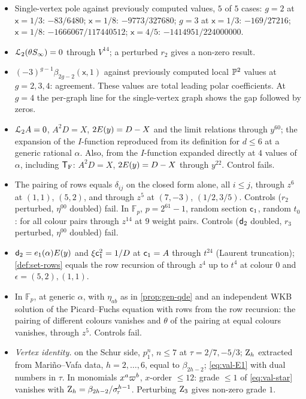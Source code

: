 \begin{itemize}
\item Single-vertex pole against previously computed values, $5$ of $5$ cases: $g=2$ at $\mathsf{x}=1/3$: $-83/6480$; $\mathsf{x}=1/8$: $-9773/327680$; $g=3$ at $\mathsf{x}=1/3$: $-169/27216$; $\mathsf{x}=1/8$: $-1666067/117440512$; $\mathsf{x}=4/5$: $-1414951/224000000$.
\item $\mathcal{L}_{2}(\theta S_{\infty})=0$ through $V^{14}$; a perturbed $r_2$ gives a non-zero result.
\item $(-3)^{g-1}\beta_{2g-2}(\mathsf{x},1)$ against previously computed local $\mathbb{P}^2$ values at $g=2,3,4$: agreement. These values are total leading polar coefficients. At $g=4$ the per-graph line for the single-vertex graph shows the gap followed by zeros.
\item $\mathcal{L}_{2} A=0$, $A^2D=X$, $2E(y)=D-X$ and the limit relations through $y^{60}$; the expansion of the $I$-function reproduced from its definition for $d\leq 6$ at a generic rational $\alpha$. Also, from the $I$-function expanded directly at $4$ values of $\alpha$, including $\mathsf{T}_{\mathrm{F}}$: $A^2D=X$, $2E(y)=D-X$ through $y^{22}$. Control fails.
\item The pairing of rows equals $\delta_{ij}$ on the closed form alone, all $i\leq j$, through $z^6$ at $(1,1)$, $(5,2)$, and through $z^5$ at $(7,-3)$, $(1/2,3/5)$. Controls ($r_2$ perturbed, $\eta^{00}$ doubled) fail. In $\mathbb{F}_p$, $p=2^{61}-1$, random section $\mathsf{c}_{1}$, random $t_0$: for all colour pairs through $z^{14}$ at $9$ weight pairs. Controls ($\mathsf{d}_{2}$ doubled, $r_3$ perturbed, $\eta^{00}$ doubled) fail.
\item $\mathsf{d}_{2}=e_1(\alpha)E(y)$ and $\xi\mathsf{c}_{1}^2=1/D$ at $\mathsf{c}_{1}=A$ through $t^{24}$ (Laurent truncation); \cref{def:set-rows} equals the row recursion of \cite{BS} through $z^4$ up to $t^4$ at colour $0$ and $\epsilon=(5,2),(1,1)$.
\item In $\mathbb{F}_p$, at generic $\alpha$, with $\eta_{ab}$ as in \cref{prop:gen-qde} and an independent WKB solution of the Picard--Fuchs equation with rows from the row recursion: the pairing of different colours vanishes and $\theta$ of the pairing at equal colours vanishes, through $z^5$. Controls fail.
\item \emph{Vertex identity.}  on the Schur side, $p_1^n$, $n\leq 7$ at $\tau=2/7,-5/3$; $\mathrm{Z}_h$ extracted from Mari\~no--Vafa data, $h=2,\dots,6$, equal to $\beta_{2h-2}$; \cref{eq:val-E1} with dual numbers in $\tau$. In monomials $x^a\varpi^b$, $x$-order $\leq 12$: grade $\leq 1$ of \cref{eq:val-star} vanishes with $\mathrm{Z}_h=\beta_{2h-2}/\sigma_{\!\tau}^{h-1}$. Perturbing $\mathrm{Z}_3$ gives non-zero grade $1$.

\end{itemize}
